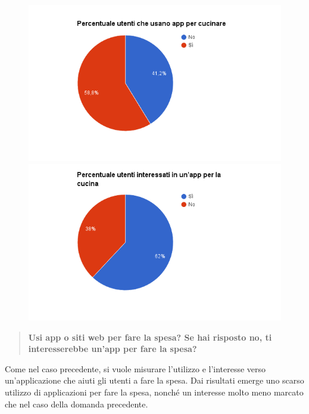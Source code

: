 \begin{figure}[H]
\centering
\begin{minipage}{.48\textwidth}
	\includegraphics[scale=0.45]{img/chart_usi_app_cucina}
\end{minipage}
\hfill
\begin{minipage}{.49\textwidth}
	\includegraphics[scale=0.45]{img/chart_vorresti_app_cucina}
\end{minipage}
\end{figure}

\begin{quote}
	\textbf{Usi app o siti web per fare la spesa? Se hai risposto no, ti interesserebbe un'app per fare la spesa?}
\end{quote}

Come nel caso precedente, si vuole misurare l'utilizzo e l'interesse verso un'applicazione che aiuti gli utenti a fare
la spesa. Dai risultati emerge uno scarso utilizzo di applicazioni per fare la spesa, nonché un interesse molto meno marcato
che nel caso della domanda precedente.

